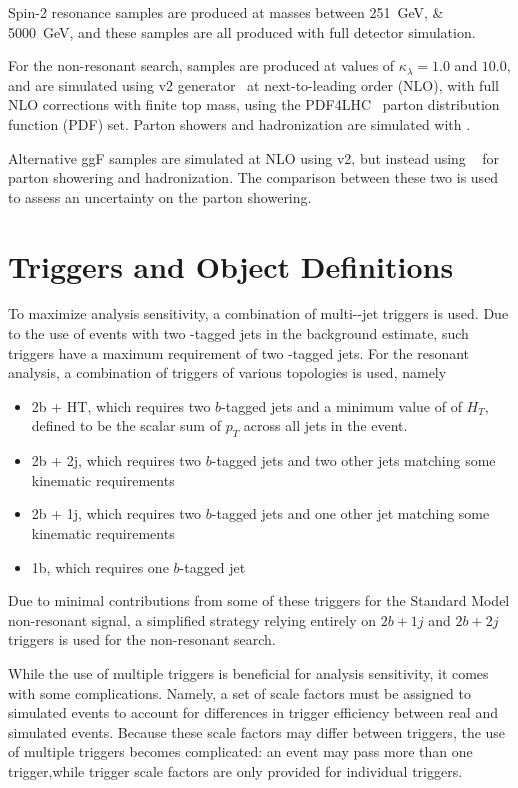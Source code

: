 Spin-2 resonance samples are produced at masses between \SIlist{251;5000}{\GeV}, 
and these samples are all produced with full detector simulation.

For the non-resonant search, samples are produced at values of $\kappa_{\lambda} = 1.0$ and $10.0$, and are simulated
using \POWHEGBOX v2 generator~\cite{Powheg1, Powheg2, Powheg3} at next-to-leading order (NLO), with full 
NLO corrections with finite top mass, using the PDF4LHC~\cite{Butterworth:2015oua} parton distribution 
function (PDF) set. Parton showers and hadronization are simulated with \PYTHIA[8].

Alternative ggF samples are simulated at NLO using \POWHEGBOX v2, but instead using \HERWIG[7]~\cite{Herwigpp} 
for parton showering and hadronization. The comparison between these two is used to assess an uncertainty 
on the parton showering.


\section{Triggers and Object Definitions}
\label{sec:trigger}
To maximize analysis sensitivity, a combination of multi-\Pqb-jet triggers is used. Due to the 
use of events with two \Pqb-tagged jets in the background estimate, such triggers have a maximum 
requirement of two \Pqb-tagged jets. For the resonant analysis, a combination of triggers of 
various topologies is used, namely
\begin{itemize}
	\item 2b + HT, which requires two $b$-tagged jets and a minimum value of of $H_{T}$, defined to be the scalar sum of $p_{T}$ across all jets in the event.
	\item 2b + 2j, which requires two $b$-tagged jets and two other jets matching some kinematic requirements
	\item 2b + 1j, which requires two $b$-tagged jets and one other jet matching some kinematic requirements
	\item 1b, which requires one $b$-tagged jet
\end{itemize}
Due to minimal contributions from some of these triggers for the Standard Model non-resonant signal, a simplified strategy relying entirely on $2b+1j$ and $2b+2j$ triggers is used for the non-resonant search.

While the use of multiple triggers is beneficial for analysis sensitivity, it comes with some
complications. Namely, a set of scale factors must be assigned to simulated events to 
account for differences in trigger efficiency between real and simulated events. Because these scale 
factors may differ between triggers, the use of multiple triggers becomes complicated: an event may pass 
more than one trigger,while trigger scale factors are only provided for individual triggers.

